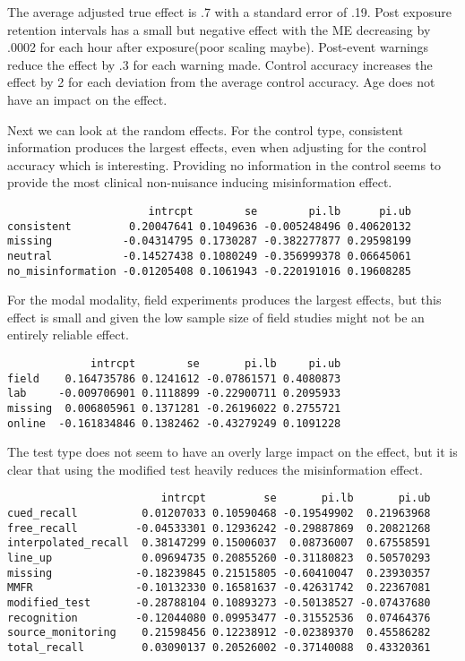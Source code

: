 \documentclass[
  letterpaper,
  DIV=11,
  numbers=noendperiod]{scrartcl}
\begin{document}
The average adjusted true effect is .7 with a standard error of .19.
Post exposure retention intervals has a small but negative effect with
the ME decreasing by .0002 for each hour after exposure(poor scaling
maybe). Post-event warnings reduce the effect by .3 for each warning
made. Control accuracy increases the effect by 2 for each deviation from
the average control accuracy. Age does not have an impact on the effect.

Next we can look at the random effects. For the control type, consistent
information produces the largest effects, even when adjusting for the
control accuracy which is interesting. Providing no information in the
control seems to provide the most clinical non-nuisance inducing
misinformation effect.

\begin{verbatim}
                      intrcpt        se        pi.lb      pi.ub
consistent         0.20047641 0.1049636 -0.005248496 0.40620132
missing           -0.04314795 0.1730287 -0.382277877 0.29598199
neutral           -0.14527438 0.1080249 -0.356999378 0.06645061
no_misinformation -0.01205408 0.1061943 -0.220191016 0.19608285
\end{verbatim}

For the modal modality, field experiments produces the largest effects,
but this effect is small and given the low sample size of field studies
might not be an entirely reliable effect.

\begin{verbatim}
             intrcpt        se       pi.lb     pi.ub
field    0.164735786 0.1241612 -0.07861571 0.4080873
lab     -0.009706901 0.1118899 -0.22900711 0.2095933
missing  0.006805961 0.1371281 -0.26196022 0.2755721
online  -0.161834846 0.1382462 -0.43279249 0.1091228
\end{verbatim}

The test type does not seem to have an overly large impact on the
effect, but it is clear that using the modified test heavily reduces the
misinformation effect.

\begin{verbatim}
                        intrcpt         se       pi.lb       pi.ub
cued_recall          0.01207033 0.10590468 -0.19549902  0.21963968
free_recall         -0.04533301 0.12936242 -0.29887869  0.20821268
interpolated_recall  0.38147299 0.15006037  0.08736007  0.67558591
line_up              0.09694735 0.20855260 -0.31180823  0.50570293
missing             -0.18239845 0.21515805 -0.60410047  0.23930357
MMFR                -0.10132330 0.16581637 -0.42631742  0.22367081
modified_test       -0.28788104 0.10893273 -0.50138527 -0.07437680
recognition         -0.12044080 0.09953477 -0.31552536  0.07464376
source_monitoring    0.21598456 0.12238912 -0.02389370  0.45586282
total_recall         0.03090137 0.20526002 -0.37140088  0.43320361
\end{verbatim}
\end{document}
